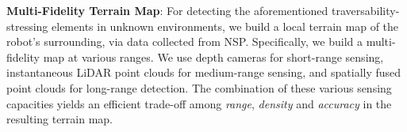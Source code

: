 \documentclass[letterpaper, 10pt, conference]{ieeeconf}      %
\newcommand{\ph}[1]{{\textbf{#1}:}} %
\begin{document}

\ph{Multi-Fidelity Terrain Map}
For detecting the aforementioned traversability-stressing elements in unknown environments, we build a local terrain map of the robot's surrounding, via data collected from NSP. %
Specifically, we build a multi-fidelity map at various ranges. We use depth cameras for short-range sensing, %
instantaneous LiDAR point clouds for medium-range sensing, %
and spatially fused point clouds \cite{oleynikova2017voxblox} for long-range detection. %
The combination of these various sensing capacities yields an efficient trade-off among \emph{range}, \emph{density} and \emph{accuracy} in the resulting terrain map.
\end{document}
